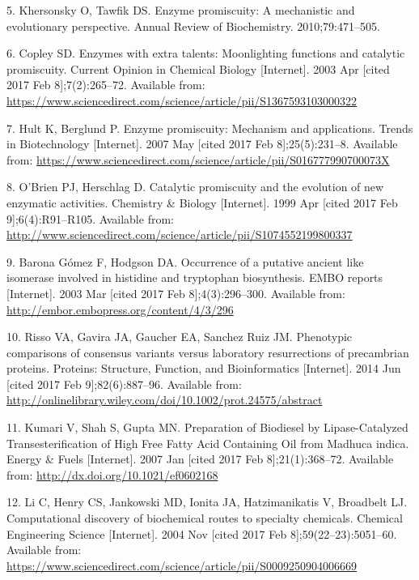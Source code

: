 \documentclass[12pt,twoside]{reedthesis}
\begin{document}
  \hypertarget{ref-khersonsky_enzyme_2010}{}
  5. Khersonsky O, Tawfik DS. Enzyme promiscuity: A mechanistic and
  evolutionary perspective. Annual Review of Biochemistry.
  2010;79:471--505.
  
  \hypertarget{ref-copley_enzymes_2003}{}
  6. Copley SD. Enzymes with extra talents: Moonlighting functions and
  catalytic promiscuity. Current Opinion in Chemical Biology
  {[}Internet{]}. 2003 Apr {[}cited 2017 Feb 8{]};7(2):265--72. Available
  from:
  \url{https://www.sciencedirect.com/science/article/pii/S1367593103000322}
  
  \hypertarget{ref-hult_enzyme_2007}{}
  7. Hult K, Berglund P. Enzyme promiscuity: Mechanism and applications.
  Trends in Biotechnology {[}Internet{]}. 2007 May {[}cited 2017 Feb
  8{]};25(5):231--8. Available from:
  \url{https://www.sciencedirect.com/science/article/pii/S016777990700073X}
  
  \hypertarget{ref-obrien_catalytic_1999}{}
  8. O'Brien PJ, Herschlag D. Catalytic promiscuity and the evolution of
  new enzymatic activities. Chemistry \& Biology {[}Internet{]}. 1999 Apr
  {[}cited 2017 Feb 9{]};6(4):R91--R105. Available from:
  \url{http://www.sciencedirect.com/science/article/pii/S1074552199800337}
  
  \hypertarget{ref-baronagomez_occurrence_2003}{}
  9. Barona Gómez F, Hodgson DA. Occurrence of a putative ancient like
  isomerase involved in histidine and tryptophan biosynthesis. EMBO
  reports {[}Internet{]}. 2003 Mar {[}cited 2017 Feb 8{]};4(3):296--300.
  Available from: \url{http://embor.embopress.org/content/4/3/296}
  
  \hypertarget{ref-risso_phenotypic_2014}{}
  10. Risso VA, Gavira JA, Gaucher EA, Sanchez Ruiz JM. Phenotypic
  comparisons of consensus variants versus laboratory resurrections of
  precambrian proteins. Proteins: Structure, Function, and Bioinformatics
  {[}Internet{]}. 2014 Jun {[}cited 2017 Feb 9{]};82(6):887--96. Available
  from:
  \url{http://onlinelibrary.wiley.com/doi/10.1002/prot.24575/abstract}
  
  \hypertarget{ref-kumari_preparation_2007}{}
  11. Kumari V, Shah S, Gupta MN. Preparation of Biodiesel by
  Lipase-Catalyzed Transesterification of High Free Fatty Acid Containing
  Oil from Madhuca indica. Energy \& Fuels {[}Internet{]}. 2007 Jan
  {[}cited 2017 Feb 8{]};21(1):368--72. Available from:
  \url{http://dx.doi.org/10.1021/ef0602168}
  
  \hypertarget{ref-li_computational_2004}{}
  12. Li C, Henry CS, Jankowski MD, Ionita JA, Hatzimanikatis V, Broadbelt
  LJ. Computational discovery of biochemical routes to specialty
  chemicals. Chemical Engineering Science {[}Internet{]}. 2004 Nov
  {[}cited 2017 Feb 8{]};59(22--23):5051--60. Available from:
  \url{https://www.sciencedirect.com/science/article/pii/S0009250904006669}
  
\end{document}
